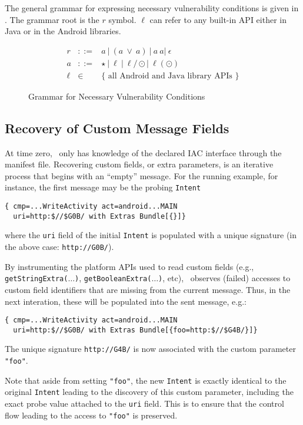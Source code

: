 The general grammar for expressing necessary vulnerability conditions is given in . The grammar root is the $r$ symbol. $\ell$ can refer to any built-in API either in Java or in the Android libraries.

\begin{figure}
	$$
	\begin{array}{rcl}
		r & ::= &  a\ |\ (a\ \vee\ a)\ |\  a\ a |\ \epsilon  \\
		a & ::= & \star\ |\ \ell\ |\ \ell / \odot |\ \ell(\odot) \\
		\ell & \in & \text{$\{$ all Android and Java library APIs $\}$}
	\end{array}
	$$
\caption{\label{Fi:grammar}Grammar for Necessary Vulnerability Conditions}
\end{figure}

\subsection{Recovery of Custom Message Fields}\label{Se:customparams}

At time zero, \Tool\ only has knowledge of the declared IAC interface through the manifest file. Recovering custom fields, or extra parameters, is an iterative process that begins with an ``empty'' message. For the running example, for instance, the first message may be the probing {\tt Intent}
\begin{lstlisting}[numbers=none]
{ cmp=...WriteActivity act=android...MAIN 
  uri=http:$//$G0B/ with Extras Bundle[{}]}
\end{lstlisting}
where the {\tt uri} field of the initial {\tt Intent} is populated with a unique signature (in the above case: {\tt http://G0B/}).

By instrumenting the platform APIs used to read custom fields (e.g., 
{\tt getStringExtra($\ldots$)}, {\tt getBooleanExtra($\ldots$)}, etc), \Tool\ observes (failed) accesses to custom field identifiers that are missing from the current message. Thus, in the next interation, these will be populated into the sent message, e.g.:
\begin{lstlisting}[numbers=none]
{ cmp=...WriteActivity act=android...MAIN 
  uri=http:$//$G0B/ with Extras Bundle[{foo=http:$//$G4B/}]}
\end{lstlisting}
The unique signature {\tt http://G4B/} is now associated with the custom parameter {\tt "foo"}. 

Note that aside from setting {\tt "foo"}, the new {\tt Intent} is exactly identical to the original {\tt Intent} leading to the discovery of this custom parameter, including the exact probe value attached to the {\tt uri} field. This is to ensure that the control flow leading to the access to {\tt "foo"} is preserved.

